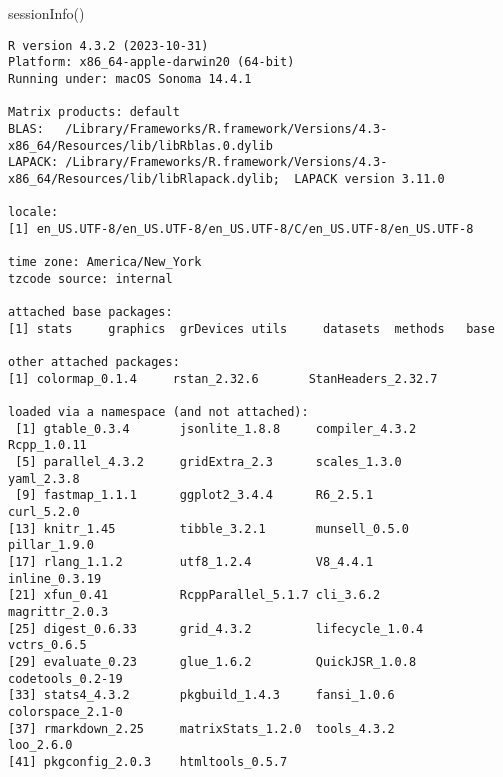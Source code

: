 \documentclass[
  letterpaper,
  DIV=11,
  numbers=noendperiod]{scrartcl}
\newenvironment{Shaded}{\begin{snugshade}}{\end{snugshade}}
\newcommand{\FunctionTok}[1]{\textcolor[rgb]{0.28,0.35,0.67}{#1}}
\newcommand{\NormalTok}[1]{\textcolor[rgb]{0.00,0.23,0.31}{#1}}
\begin{document}
\begin{Shaded}
\begin{Highlighting}[]
\FunctionTok{sessionInfo}\NormalTok{()}
\end{Highlighting}
\end{Shaded}

\begin{verbatim}
R version 4.3.2 (2023-10-31)
Platform: x86_64-apple-darwin20 (64-bit)
Running under: macOS Sonoma 14.4.1

Matrix products: default
BLAS:   /Library/Frameworks/R.framework/Versions/4.3-x86_64/Resources/lib/libRblas.0.dylib 
LAPACK: /Library/Frameworks/R.framework/Versions/4.3-x86_64/Resources/lib/libRlapack.dylib;  LAPACK version 3.11.0

locale:
[1] en_US.UTF-8/en_US.UTF-8/en_US.UTF-8/C/en_US.UTF-8/en_US.UTF-8

time zone: America/New_York
tzcode source: internal

attached base packages:
[1] stats     graphics  grDevices utils     datasets  methods   base     

other attached packages:
[1] colormap_0.1.4     rstan_2.32.6       StanHeaders_2.32.7

loaded via a namespace (and not attached):
 [1] gtable_0.3.4       jsonlite_1.8.8     compiler_4.3.2     Rcpp_1.0.11       
 [5] parallel_4.3.2     gridExtra_2.3      scales_1.3.0       yaml_2.3.8        
 [9] fastmap_1.1.1      ggplot2_3.4.4      R6_2.5.1           curl_5.2.0        
[13] knitr_1.45         tibble_3.2.1       munsell_0.5.0      pillar_1.9.0      
[17] rlang_1.1.2        utf8_1.2.4         V8_4.4.1           inline_0.3.19     
[21] xfun_0.41          RcppParallel_5.1.7 cli_3.6.2          magrittr_2.0.3    
[25] digest_0.6.33      grid_4.3.2         lifecycle_1.0.4    vctrs_0.6.5       
[29] evaluate_0.23      glue_1.6.2         QuickJSR_1.0.8     codetools_0.2-19  
[33] stats4_4.3.2       pkgbuild_1.4.3     fansi_1.0.6        colorspace_2.1-0  
[37] rmarkdown_2.25     matrixStats_1.2.0  tools_4.3.2        loo_2.6.0         
[41] pkgconfig_2.0.3    htmltools_0.5.7   
\end{verbatim}
\end{document}
